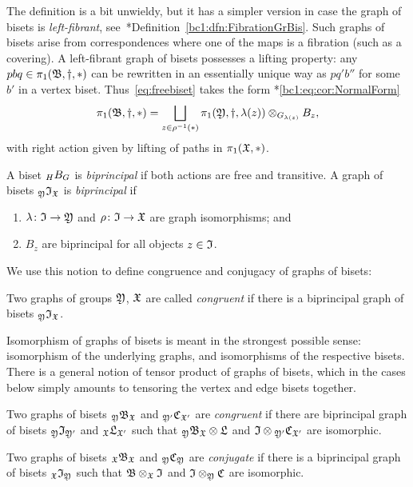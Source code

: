 \documentclass{amsart}
\begin{document}
The definition is a bit unwieldy, but it has a simpler version in case
the graph of bisets is \emph{left-fibrant},
see~\cite{bartholdi-dudko:bc1}*{Definition~\ref{bc1:dfn:FibrationGrBis}}. Such
graphs of bisets arise from correspondences where one of the maps is a
fibration (such as a covering). A left-fibrant graph of bisets
possesses a lifting property: any
$p b q \in \pi_1({\mathfrak B}, \dagger,*)$ can be rewritten in an
essentially unique way as $p q' b''$ for some $b'$ in a vertex
biset. Thus~\eqref{eq:freebiset} takes the form
\cite{bartholdi-dudko:bc1}*{\eqref{bc1:eq:cor:NormalForm}}
\begin{equation}
  \label{eq:cor:NormalForm}
  \pi_1({\mathfrak B},\dagger,*)=\bigsqcup_{z\in \rho^{-1}(*)}\pi_1({\mathfrak Y},\dagger,\lambda(z))\otimes_{G_{\lambda(z)}}B_z,
\end{equation}
with right action given by lifting of paths in $\pi_1({\mathfrak X},*)$.

A biset $\subscript H B_G$ is \emph{biprincipal} if both actions are free and
transitive. A graph of bisets $\subscript \gfY \gfI_{\gf}$ is
\emph{biprincipal} if
\begin{enumerate}
\item $\lambda\colon {\mathfrak I}\to{\mathfrak Y}$ and $\rho\colon
  {\mathfrak I}\to{\mathfrak X}$ are graph isomorphisms; and
\item $B_z$ are biprincipal for all objects $z\in {\mathfrak I}$.\qedhere
\end{enumerate}

\noindent We use this notion to define congruence and conjugacy of
graphs of bisets:
\begin{defn}\label{defn:conjugategob}
  Two graphs of groups ${\mathfrak Y}$, ${\mathfrak X}$ are called \emph{congruent} if
  there is a biprincipal graph of bisets $\subscript\gfY\gfI_\gf$.

  Isomorphism of graphs of bisets is meant in the strongest possible
  sense: isomorphism of the underlying graphs, and isomorphisms of the
  respective bisets. There is a general notion of tensor product of
  graphs of bisets, which in the cases below simply amounts to
  tensoring the vertex and edge bisets together.

  Two graphs of bisets $\subscript\gfY\gfB_\gf$ and
  $\subscript {\gfY'} \gfC_{\gf'}$ are \emph{congruent} if there are
  biprincipal graph of bisets $\subscript\gfY\gfI_{\gfY'}$ and
  $\subscript\gf{\mathfrak L}_{\gf'}$ such that
  $\subscript \gfY\gfB_\gf\otimes \mathfrak L$ and
  $\gfI \otimes \subscript{\gfY'}\gfC_{\gf'} $ are isomorphic.

  Two graphs of bisets $\subscript \gf\gfB_\gf$ and
  $\subscript \gfY\gfC_\gfY$ are \emph{conjugate} if
  there is a biprincipal graph of bisets
  $\subscript \gf\gfI_\gfY$ such that
  ${\mathfrak B}\otimes_{\mathfrak X} {\mathfrak I}$ and
  ${\mathfrak I}\otimes_{\mathfrak Y}{\mathfrak C}$ are isomorphic.
\end{defn}
\end{document}

